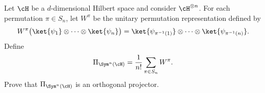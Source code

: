 Let $\cH$ be a $d$-dimensional Hilbert space and consider $\cH^{\otimes n}$. For each permutation $\pi\in S_n$, let $W^\pi$ be the unitary permutation representation defined by
$$
W^\pi
\bigl(\ket{\psi_1}\otimes\cdots\otimes\ket{\psi_n}\bigr)
=
\ket{\psi_{\pi^{-1}(1)}}\otimes\cdots\otimes\ket{\psi_{\pi^{-1}(n)}}.
$$
Define
$$
\Pi_{\Sym^n(\cH)}
=
\frac{1}{n!}\sum_{\pi\in S_n}W^\pi.
$$
Prove that $\Pi_{\Sym^n(\cH)}$ is an orthogonal projector.
